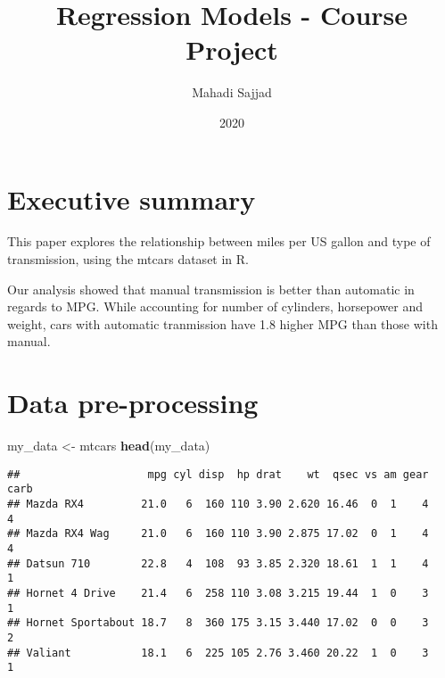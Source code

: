 \documentclass[
]{article}
\title{Regression Models - Course Project}
\author{Mahadi Sajjad}
\date{2020}
\newenvironment{Shaded}{\begin{snugshade}}{\end{snugshade}}
\newcommand{\KeywordTok}[1]{\textcolor[rgb]{0.13,0.29,0.53}{\textbf{#1}}}
\newcommand{\NormalTok}[1]{#1}
\newcommand{\StringTok}[1]{\textcolor[rgb]{0.31,0.60,0.02}{#1}}
\begin{document}
\maketitle

\hypertarget{executive-summary}{%
\section{Executive summary}\label{executive-summary}}

This paper explores the relationship between miles per US gallon and
type of transmission, using the mtcars dataset in R.

Our analysis showed that manual transmission is better than automatic in
regards to MPG. While accounting for number of cylinders, horsepower and
weight, cars with automatic tranmission have 1.8 higher MPG than those
with manual.

\hypertarget{data-pre-processing}{%
\section{Data pre-processing}\label{data-pre-processing}}

\begin{Shaded}
\begin{Highlighting}[]
\NormalTok{my_data <-}\StringTok{ }\NormalTok{mtcars}
\KeywordTok{head}\NormalTok{(my_data)}
\end{Highlighting}
\end{Shaded}

\begin{verbatim}
##                    mpg cyl disp  hp drat    wt  qsec vs am gear carb
## Mazda RX4         21.0   6  160 110 3.90 2.620 16.46  0  1    4    4
## Mazda RX4 Wag     21.0   6  160 110 3.90 2.875 17.02  0  1    4    4
## Datsun 710        22.8   4  108  93 3.85 2.320 18.61  1  1    4    1
## Hornet 4 Drive    21.4   6  258 110 3.08 3.215 19.44  1  0    3    1
## Hornet Sportabout 18.7   8  360 175 3.15 3.440 17.02  0  0    3    2
## Valiant           18.1   6  225 105 2.76 3.460 20.22  1  0    3    1
\end{verbatim}
\end{document}
